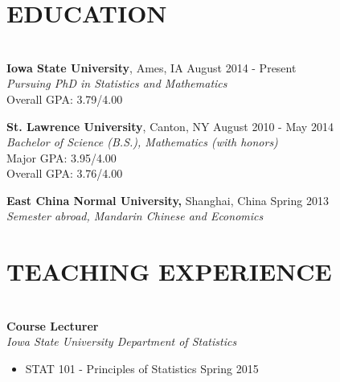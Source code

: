 \documentclass{res} %
\begin{document}
\address{
{\bf Department of Mathematics} \\
Iowa State University \\
244 Carver Hall \\
Ames, IA 50011 \\
}
\begin{resume}


\section{EDUCATION}

\hrulefill \\ %
{\bf Iowa State University}, Ames, IA \hfill August 2014 - Present \\
{\sl Pursuing PhD in Statistics and Mathematics} \\
Overall GPA: 3.79/4.00

{\bf St. Lawrence University}, Canton, NY \hfill August 2010 - May 2014 \\
{\sl Bachelor of Science (B.S.), Mathematics (with honors)} \\
Major GPA: 3.95/4.00 \\
Overall GPA: 3.76/4.00 

{\bf East China Normal University,} Shanghai, China \hfill Spring 2013 \\
{\sl Semester abroad, Mandarin Chinese and Economics} 





\section{TEACHING EXPERIENCE}

\hrulefill \\
{\bf Course Lecturer} \\
{\sl Iowa State University Department of Statistics}
\begin{itemize} \itemsep -2pt
\item STAT 101 - Principles of Statistics \hfill Spring 2015
\end{itemize}


\end{resume}
\end{document}
